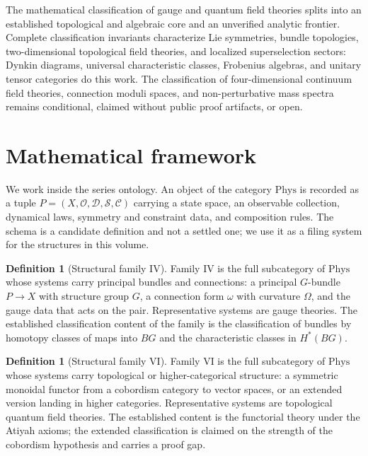 \documentclass[11pt,letterpaper]{article}
\theoremstyle{definition}
\newtheorem{definition}[theorem]{Definition}
\theoremstyle{remark}
\begin{document}
The mathematical classification of gauge and quantum field theories splits into an established topological and algebraic core and an unverified analytic frontier. Complete classification invariants characterize Lie symmetries, bundle topologies, two-dimensional topological field theories, and localized superselection sectors: Dynkin diagrams, universal characteristic classes, Frobenius algebras, and unitary tensor categories do this work. The classification of four-dimensional continuum field theories, connection moduli spaces, and non-perturbative mass spectra remains conditional, claimed without public proof artifacts, or open.

\section{Mathematical framework}
\label{sec:framework}

We work inside the series ontology. An object of the category $\mathrm{Phys}$ is recorded as a tuple $P = (X, \mathcal{O}, \mathcal{D}, \mathcal{S}, \mathcal{C})$ carrying a state space, an observable collection, dynamical laws, symmetry and constraint data, and composition rules. The schema is a candidate definition and not a settled one; we use it as a filing system for the structures in this volume.

\begin{definition}[Structural family IV]
\label{def:family-iv}
Family IV is the full subcategory of $\mathrm{Phys}$ whose systems carry principal bundles and connections: a principal $G$-bundle $P \to X$ with structure group $G$, a connection form $\omega$ with curvature $\Omega$, and the gauge data that acts on the pair. Representative systems are gauge theories. The established classification content of the family is the classification of bundles by homotopy classes of maps into $BG$ and the characteristic classes in $H^*(BG)$.
\end{definition}

\begin{definition}[Structural family VI]
\label{def:family-vi}
Family VI is the full subcategory of $\mathrm{Phys}$ whose systems carry topological or higher-categorical structure: a symmetric monoidal functor from a cobordism category to vector spaces, or an extended version landing in higher categories. Representative systems are topological quantum field theories. The established content is the functorial theory under the Atiyah axioms; the extended classification is claimed on the strength of the cobordism hypothesis and carries a proof gap.
\end{definition}
\end{document}
